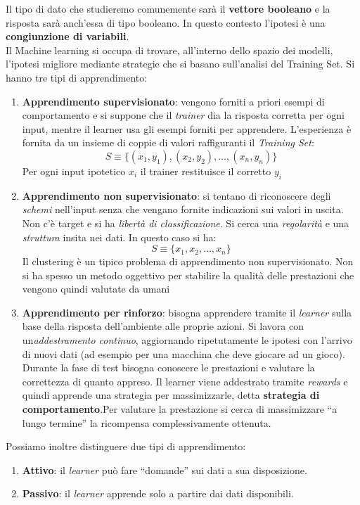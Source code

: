 Il tipo di dato che studieremo comunemente sarà il \textbf{vettore booleano} e la risposta sarà anch'essa di tipo booleano. In questo contesto l'ipotesi è una \textbf{congiunzione di variabili}.\\
Il Machine learning si occupa di trovare, all'interno dello spazio dei modelli, l'ipotesi migliore mediante strategie che si basano sull'analisi del Training Set.
Si hanno tre tipi di apprendimento:
\begin{enumerate}
  \item \textbf{Apprendimento supervisionato}: vengono forniti a priori
  esempi di comportamento e si suppone che il \textit{trainer} dia la risposta
  corretta per ogni input, mentre il learner usa gli esempi forniti per
  apprendere. L'esperienza è fornita da un insieme di coppie di valori raffiguranti il \textit{Training Set}:
  \[S\equiv\{(x_1,y_1),(x_2,y_2),\ldots,(x_n,y_n)\}\]
  Per ogni input ipotetico $x_i$ il trainer restituisce il corretto
  $y_i$
  \item \textbf{Apprendimento non supervisionato}: si tentano di riconoscere degli
  \textit{schemi} nell'input senza che vengano fornite indicazioni sui valori in uscita. Non c'è
  target e si ha \textit{libertà di classificazione}. Si cerca una
  \textit{regolarità} e una \textit{struttura} insita nei dati. In questo caso
  si ha: 
  \[S\equiv\{x_1,x_2,\ldots,x_n\}\]
  Il clustering è un tipico problema di apprendimento non supervisionato. Non si
  ha spesso un metodo oggettivo per stabilire la qualità delle prestazioni che vengono quindi
  valutate da umani
  \item \textbf{Apprendimento per rinforzo}: bisogna apprendere tramite il
  \textit{learner} sulla base della risposta dell’ambiente alle proprie azioni. Si lavora con
  un\textit{addestramento continuo}, aggiornando ripetutamente le ipotesi con l'arrivo di
  nuovi dati (ad esempio per una macchina che deve giocare ad un gioco). Durante la
  fase di test bisogna conoscere le prestazioni e valutare la correttezza di
  quanto appreso. Il learner viene addestrato tramite \textit{rewards} e quindi
  apprende una strategia per massimizzarle, detta
  \textbf{strategia di comportamento}.Per valutare la prestazione si cerca di
  massimizzare ``a lungo termine'' la ricompensa complessivamente ottenuta.
\end{enumerate}
Possiamo inoltre distinguere due tipi di apprendimento:
\begin{enumerate}
  \item \textbf{Attivo}: il \textit{learner} può fare ``domande'' sui dati
  a sua disposizione. 
  \item \textbf{Passivo}: il \textit{learner} apprende solo a partire dai
  dati disponibili. 
\end{enumerate}
